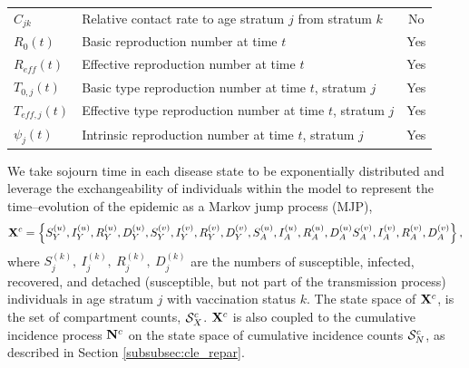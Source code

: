 \begin{table}[htbp]
\begin{tabular}{llc}
		$ C_{jk} $ & Relative contact rate to age stratum $ j $ from stratum $ k $ & No\\
		$ R_0(t) $ & Basic reproduction number at time $ t $ & Yes \\
		$ R_{eff}(t) $ & Effective reproduction number at time $ t $ & Yes \\
		$ T_{0,j}(t) $ & Basic type reproduction number at time $ t $, stratum $ j $ & Yes \\
		$ T_{eff,j}(t) $ & Effective type reproduction number at time $ t $, stratum $ j $ & Yes \\
		$ \psi_j(t) $ & Intrinsic reproduction number at time $ t $, stratum $ j $ & Yes\\
		\hline
	\end{tabular}
\end{table}

We take sojourn time in each disease state to be exponentially distributed and leverage the exchangeability of individuals within the model to represent the time--evolution of the epidemic as a Markov jump process (MJP), $$ \mathbf{X}^c = \left \lbrace S_{Y}^{(u)}, I_{Y}^{(u)}, R_{Y}^{(u)},D_Y^{(u)},
S_{Y}^{(v)}, I_{Y}^{(v)}, R_{Y}^{(v)},D_Y^{(v)}, S_{A}^{(u)}, I_{A}^{(u)}, R_{A}^{(u)},D_A^{(u)}
S_{A}^{(v)}, I_{A}^{(v)}, R_{A}^{(v)},D_A^{(v)} \right \rbrace, $$ where $ S_j^{(k)},\ I_j^{(k)},\ R_j^{(k)},\ D_j^{(k)} $ are the numbers of susceptible, infected, recovered, and detached (susceptible, but not part of the transmission process) individuals in age stratum $ j $ with vaccination status $ k $. The state space of $ \mathbf{X}^c $, is the set of compartment counts, $ \mathcal{S}_X^c$. $ \mathbf{X}^c $ is also coupled to the cumulative incidence process $ \mathbf{N}^c $ on the state space of cumulative incidence counts $ \mathcal{S}_N^c $, as described in Section \ref{subsubsec:cle_repar}.

